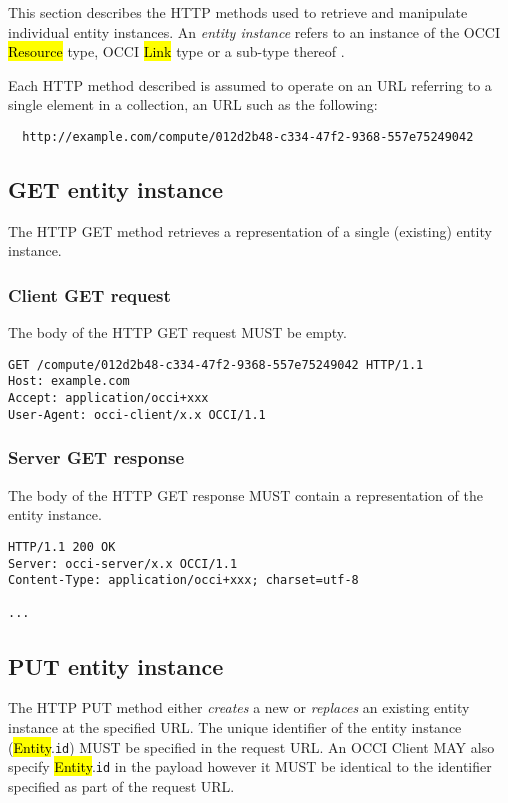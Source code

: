 \documentclass[10pt,a4paper]{article}
\begin{document}

This section describes the HTTP methods used to retrieve and manipulate
individual entity instances. An {\em entity instance} refers to an instance
of the OCCI \hl{Resource} type, OCCI \hl{Link} type or a sub-type thereof
\cite{occi:core}.

Each HTTP method described is assumed to operate
on an URL referring to a single element in a collection, an URL such as the
following:
\begin{verbatim}
  http://example.com/compute/012d2b48-c334-47f2-9368-557e75249042
\end{verbatim}


\subsection{GET entity instance}
The HTTP GET method retrieves a representation of a single (existing)
entity instance.

\subsubsection{Client GET request}
The body of the HTTP GET request MUST be empty.
\begin{verbatim}
GET /compute/012d2b48-c334-47f2-9368-557e75249042 HTTP/1.1
Host: example.com
Accept: application/occi+xxx
User-Agent: occi-client/x.x OCCI/1.1
\end{verbatim}

\subsubsection{Server GET response}
The body of the HTTP GET response MUST contain a representation of the entity
instance.
\begin{verbatim}
HTTP/1.1 200 OK
Server: occi-server/x.x OCCI/1.1
Content-Type: application/occi+xxx; charset=utf-8

...
\end{verbatim}


\subsection{PUT entity instance}
The HTTP PUT method either {\em creates} a new or {\em replaces} an existing
entity instance at the specified URL.
%
The unique identifier of the entity instance (\hl{Entity}.{\tt id}) MUST be
specified in the request URL.
An OCCI Client MAY also specify \hl{Entity}.{\tt id} in the payload however it
MUST be identical to the identifier specified as part of the request URL.
\end{document}
